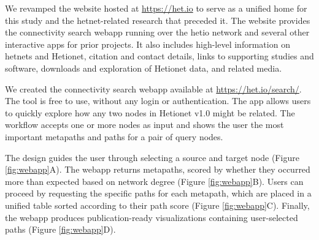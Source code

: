 We revamped the website hosted at \url{https://het.io} to serve as a unified home for this study and the hetnet-related research that preceded it.
The website provides the connectivity search webapp running over the hetio network and several other interactive apps for prior projects.
It also includes high-level information on hetnets and Hetionet,
citation and contact details,
links to supporting studies and software,
downloads and exploration of Hetionet data,
and related media.

We created the connectivity search webapp available at \url{https://het.io/search/}.
The tool is free to use, without any login or authentication.
The app allows users to quickly explore how any two nodes in Hetionet v1.0 might be related.
The workflow accepts one or more nodes as input and shows the user the most important metapaths and paths for a pair of query nodes.

The design guides the user through selecting a source and target node (Figure \ref{fig:webapp}A).
The webapp returns metapaths, scored by whether they occurred more than expected based on network degree (Figure \ref{fig:webapp}B).
Users can proceed by requesting the specific paths for each metapath,
which are placed in a unified table sorted according to their path score (Figure \ref{fig:webapp}C).
Finally, the webapp produces publication-ready visualizations containing user-selected paths (Figure \ref{fig:webapp}D).

